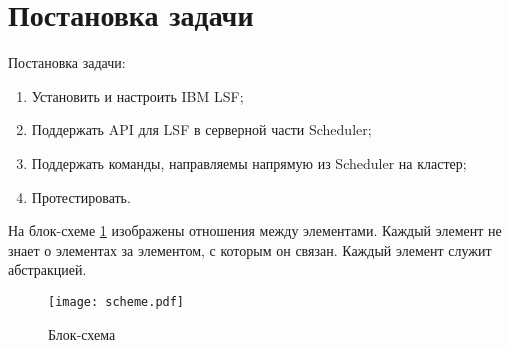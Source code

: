 \section{Постановка задачи}

Постановка задачи:

\begin{enumerate}
    \item Установить и настроить IBM LSF;
    \item Поддержать API для LSF в серверной части Scheduler;
    \item Поддержать команды, направляемы напрямую из Scheduler на кластер;
    \item Протестировать.
\end{enumerate}

На блок-схеме \ref{fig:block-scheme} изображены отношения между элементами. Каждый элемент не знает о элементах за элементом, с которым он связан. Каждый элемент служит абстракцией.

\begin{figure}[h]
    \centering
    \texttt{[image: scheme.pdf]}
    \caption{Блок-схема}
    \label{fig:block-scheme}
\end{figure}

\clearpage
